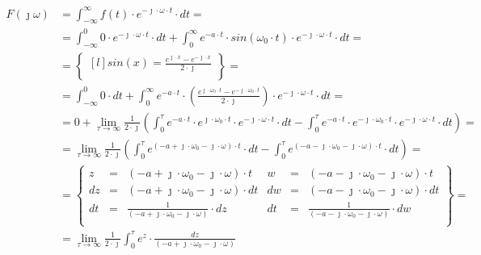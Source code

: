 \begin{task}

\begin{align*}
F(\jmath \omega )&=\int_{-\infty }^{\infty}f(t) \cdot e^{-\jmath \cdot \omega \cdot t}\cdot dt=\\
&=\int_{-\infty}^{0} 0 \cdot e^{-\jmath \cdot \omega \cdot t}\cdot dt
+\int_{0}^{\infty} e^{-a \cdot t} \cdot sin(\omega_{0} \cdot t) \cdot e^{-\jmath \cdot \omega \cdot t}\cdot dt=\\
&=\begin{Bmatrix*}[l]%
sin(x)=\frac{e^{\jmath \cdot x} - e^{-\jmath \cdot x}}{2 \cdot \jmath}\\
\end{Bmatrix*}=\\
&=\int_{-\infty}^{0} 0 \cdot dt +\int_{0}^{\infty} e^{-a \cdot t} \cdot \left(\frac{e^{\jmath \cdot \omega_{0} \cdot t} - e^{-\jmath \cdot  \omega_{0} \cdot t}}{2 \cdot \jmath} \right) \cdot e^{-\jmath \cdot \omega \cdot t}\cdot dt=\\
&=0 + \lim_{\tau \rightarrow \infty }\frac{1}{2 \cdot \jmath}\left(
\int_{0}^{\tau} e^{-a\cdot t}\cdot e^{\jmath \cdot \omega_{0} \cdot t} \cdot e^{-\jmath \cdot \omega \cdot t} \cdot dt
-\int_{0}^{\tau} e^{-a\cdot t}\cdot e^{-\jmath \cdot \omega_{0} \cdot t} \cdot e^{-\jmath \cdot \omega \cdot t} \cdot dt \right)=\\
&=\lim_{\tau \rightarrow \infty }\frac{1}{2 \cdot \jmath}\left(
\int_{0}^{\tau} e^{(-a + \jmath \cdot \omega_{0} -\jmath \cdot \omega) \cdot t} \cdot dt
-\int_{0}^{\tau} e^{(-a - \jmath \cdot \omega_{0} -\jmath \cdot \omega) \cdot t} \cdot dt \right)=\\
&=\begin{Bmatrix}
z&=&(-a + \jmath \cdot \omega_{0} -\jmath \cdot \omega) \cdot t&w&=&(-a - \jmath \cdot \omega_{0} -\jmath \cdot \omega) \cdot t\\
dz&=&(-a + \jmath \cdot \omega_{0} -\jmath \cdot \omega) \cdot dt&dw&=&(-a - \jmath \cdot \omega_{0} -\jmath \cdot \omega) \cdot dt\\
dt&=&\frac{1}{(-a + \jmath \cdot \omega_{0} -\jmath \cdot \omega)} \cdot dz&dt&=&\frac{1}{(-a - \jmath \cdot \omega_{0} -\jmath \cdot \omega)} \cdot dw\\
\end{Bmatrix}=\\
&=\lim_{\tau \rightarrow \infty }\frac{1}{2 \cdot \jmath}
\int_{0}^{\tau} e^{z} \cdot \frac{dz}{(-a + \jmath \cdot \omega_{0} -\jmath \cdot \omega)}

\end{align*}
\end{task}
